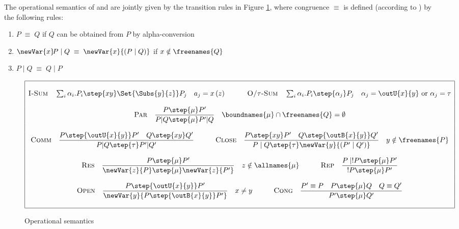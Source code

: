 \documentclass[11pt,techReport]{eptcs}
\begin{document}
The operational semantics of \procmix and \procsep are jointly given by the transition rules in Figure \ref{fig:operationalSemantics}, where congruence $ \equiv $ is defined (according to \cite{palamidessi03}) by the following rules:
\begin{enumerate}
	\item $ P \; \equiv \; Q $ if $ Q $ can be obtained from $ P $ by alpha-conversion
	\item $ \newVar{x}\!{P} \mid Q \; \equiv \; \newVar{x}{\left(  P \mid Q  \right)} $ if $ x \notin \freenames{Q} $
	\item $ P \mid Q \; \equiv \; Q \mid P $
\end{enumerate}
\begin{figure}[ht]
	\begin{align*}
\begin{array}{|c|}
			\hline
			\\
			\textsc{I-Sum} \quad \sum_i{\alpha_i.P_i} \step{xy} \Set{ \Subs{y}{z} } P_j \quad a_j = x\left( z \right) \hspace*{3em} \textsc{O/$ \tau $-Sum} \quad \sum_i{\alpha_i.P_i} \step{\alpha_j} P_j \quad \alpha_j = \outU{x}{y} \text{ or } \alpha_j = \tau\\
			\\
			\textsc{Par} \quad \dfrac{P \step{\mu} P'}{P | Q \step{\mu} P' | Q} \quad \boundnames{\mu} \cap \freenames{Q} = \emptyset\\ \\
			\textsc{Comm} \quad \dfrac{P \step{\outU{x}{y}} P' \quad Q \step{xy} Q'}{P | Q \step{\tau} P' | Q'} \hspace*{3em} \textsc{Close} \quad \dfrac{P \step{xy} P' \quad Q \step{\outB{x}{y}} Q'}{P \mid Q \step{\tau} \newVar{y}{\left(P' \mid Q'\right)}} \quad y \notin \freenames{P}\\ \\
			\textsc{Res} \quad \dfrac{P \step{\mu} P'}{\newVar{z}{P} \step{\mu} \newVar{z}{P'}} \quad z \notin \allnames{\mu} \hspace*{3em} \textsc{Rep} \quad \dfrac{P \mid !P \step{\mu} P'}{!P \step{\mu} P'}\\
			\\
			\textsc{Open} \quad \dfrac{P \step{\outU{x}{y}} P'}{\newVar{y}{P \step{\outB{x}{y}} P'}} \quad x \neq y \hspace*{3em} \textsc{Cong} \quad \dfrac{P' \equiv P \quad P \step{\mu} Q \quad Q \equiv Q'}{P' \step{\mu} Q'}\\
			\\
\hline
		\end{array}
	\end{align*}
	\caption{Operational semantics} \label{fig:operationalSemantics}
\end{figure}
\end{document}
